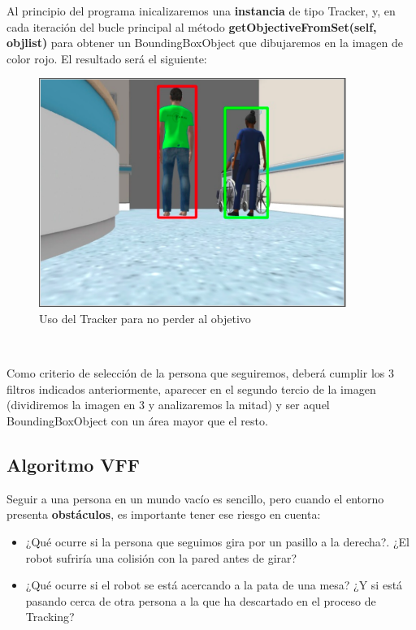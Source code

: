 Al principio del programa inicalizaremos una \textbf{instancia} de tipo Tracker, y, en cada iteración del bucle principal al método \textbf{getObjectiveFromSet(self, objlist)} para obtener un BoundingBoxObject que dibujaremos en la imagen de color rojo. El resultado será el siguiente:\\

\begin{figure} [H]
  \begin{center}
    \includegraphics[width=10cm]{imagenes/aplicando-tracker.png}
  \end{center}
  \caption[Usando el Tracker para no perder al objetivo]{Uso del Tracker para no perder al objetivo}
  \label{fig:uso_tracker}
\end{figure}\

Como criterio de selección de la persona que seguiremos, deberá cumplir los 3 filtros indicados anteriormente, aparecer en el segundo tercio de la imagen (dividiremos la imagen en 3 y analizaremos la mitad) y ser aquel BoundingBoxObject con un área mayor que el resto.\\


\subsection{Algoritmo VFF}
\label{subsec:vff}

Seguir a una persona en un mundo vacío es sencillo, pero cuando el entorno presenta \textbf{obstáculos}, es importante tener ese riesgo en cuenta:\\

\begin{itemize}
	\item ¿Qué ocurre si la persona que seguimos gira por un pasillo a la derecha?. ¿El robot sufriría una colisión con la pared antes de girar?
	\item ¿Qué ocurre si el robot se está acercando a la pata de una mesa? ¿Y si está pasando cerca de otra persona a la que ha descartado en el proceso de Tracking?
\end{itemize}\

